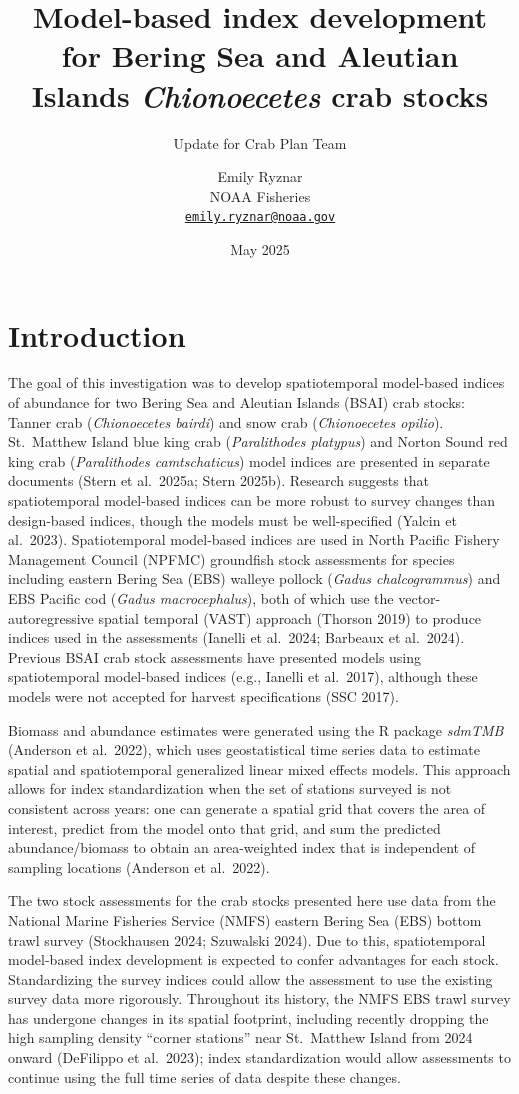 \documentclass[
]{article}
\title{Model-based index development for Bering Sea and Aleutian Islands \emph{Chionoecetes} crab stocks}
\subtitle{Update for Crab Plan Team}
\author{Emily Ryznar\\
NOAA Fisheries\\
\href{mailto:emily.ryznar@noaa.gov}{\nolinkurl{emily.ryznar@noaa.gov}}}
\date{May 2025}
\begin{document}
\maketitle


\section*{Introduction}\label{introduction}

The goal of this investigation was to develop spatiotemporal model-based indices of abundance for two Bering Sea and Aleutian Islands (BSAI) crab stocks: Tanner crab (\emph{Chionoecetes bairdi}) and snow crab (\emph{Chionoecetes opilio}). St.~Matthew Island blue king crab (\emph{Paralithodes platypus}) and Norton Sound red king crab (\emph{Paralithodes camtschaticus}) model indices are presented in separate documents (Stern et al.~2025a; Stern 2025b). Research suggests that spatiotemporal model-based indices can be more robust to survey changes than design-based indices, though the models must be well-specified (Yalcin et al.~2023). Spatiotemporal model-based indices are used in North Pacific Fishery Management Council (NPFMC) groundfish stock assessments for species including eastern Bering Sea (EBS) walleye pollock (\emph{Gadus chalcogrammus}) and EBS Pacific cod (\emph{Gadus macrocephalus}), both of which use the vector-autoregressive spatial temporal (VAST) approach (Thorson 2019) to produce indices used in the assessments (Ianelli et al.~2024; Barbeaux et al.~2024). Previous BSAI crab stock assessments have presented models using spatiotemporal model-based indices (e.g., Ianelli et al.~2017), although these models were not accepted for harvest specifications (SSC 2017).

Biomass and abundance estimates were generated using the R package \emph{sdmTMB} (Anderson et al.~2022), which uses geostatistical time series data to estimate spatial and spatiotemporal generalized linear mixed effects models. This approach allows for index standardization when the set of stations surveyed is not consistent across years: one can generate a spatial grid that covers the area of interest, predict from the model onto that grid, and sum the predicted abundance/biomass to obtain an area-weighted index that is independent of sampling locations (Anderson et al.~2022).

The two stock assessments for the crab stocks presented here use data from the National Marine Fisheries Service (NMFS) eastern Bering Sea (EBS) bottom trawl survey (Stockhausen 2024; Szuwalski 2024). Due to this, spatiotemporal model-based index development is expected to confer advantages for each stock. Standardizing the survey indices could allow the assessment to use the existing survey data more rigorously. Throughout its history, the NMFS EBS trawl survey has undergone changes in its spatial footprint, including recently dropping the high sampling density ``corner stations'' near St.~Matthew Island from 2024 onward (DeFilippo et al.~2023); index standardization would allow assessments to continue using the full time series of data despite these changes.
\end{document}
